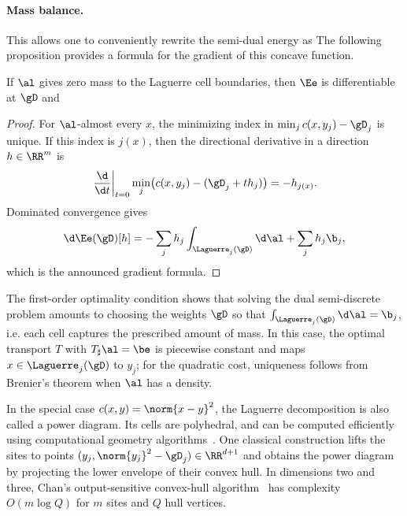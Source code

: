 \paragraph{Mass balance.}

This allows one to conveniently rewrite the semi-dual energy as
The following proposition provides a formula for the gradient of this concave function.

\begin{prop}
If $\al$ gives zero mass to the Laguerre cell boundaries, then $\Ee$ is differentiable at $\gD$ and
\end{prop}
\begin{proof}
	For $\al$-almost every $x$, the minimizing index in $\min_j c(x,y_j)-\gD_j$ is unique. If this index is $j(x)$, then the directional derivative in a direction $h\in\RR^m$ is
	\[
		\left.\frac{\d}{\d t}\right|_{t=0}
		\min_j \bigl(c(x,y_j)-(\gD_j+t h_j)\bigr)
		=
		-h_{j(x)}.
	\]
	Dominated convergence gives
	\[
		\d\Ee(\gD)[h]
		=
		-\sum_j h_j\int_{\Laguerre_j(\gD)}\d\al
		+\sum_j h_j\b_j,
	\]
	which is the announced gradient formula.
\end{proof}

The first-order optimality condition shows that solving the dual semi-discrete problem amounts to choosing the weights $\gD$ so that $\int_{\Laguerre_{j}(\gD)} \d\al = \b_j$, i.e. each cell captures the prescribed amount of mass. In this case, the optimal transport $T$ with $T_\sharp \al=\be$ is piecewise constant and maps $x \in \Laguerre_{j}(\gD)$ to $y_j$; for the quadratic cost, uniqueness follows from Brenier's theorem when $\al$ has a density.

In the special case $c(x,y)=\norm{x-y}^2$, the Laguerre decomposition is also called a power diagram. Its cells are polyhedral, and can be computed efficiently using computational geometry algorithms~\cite{aurenhammer1987power,AurenhammerHA98,Merigot11}. One classical construction lifts the sites to points $(y_j,\norm{y_j}^2-\gD_j)\in\RR^{d+1}$ and obtains the power diagram by projecting the lower envelope of their convex hull. In dimensions two and three, Chan's output-sensitive convex-hull algorithm~\cite{chan1996optimal} has complexity $O(m\log Q)$ for $m$ sites and $Q$ hull vertices.

